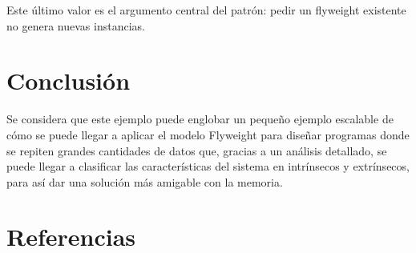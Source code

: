 \documentclass{article}
\begin{document}
Este último valor es el argumento central del patrón: pedir un flyweight existente no genera nuevas instancias.

\section*{Conclusión}
Se considera que este ejemplo puede englobar un pequeño ejemplo escalable de cómo se puede llegar a aplicar el modelo Flyweight para diseñar programas donde se repiten grandes cantidades de datos que, gracias a un análisis detallado, se puede llegar a clasificar las características del sistema en intrínsecos y extrínsecos, para así dar una solución más amigable con la memoria.

\section*{Referencias}
\nocite{*}
\printbibliography[heading=none]
\end{document}
